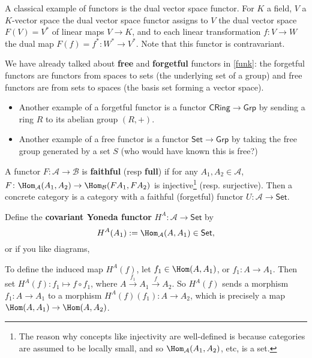 \begin{example}
    A classical example of functors is the dual vector space functor. For $K$ a field, $V$ a $K$-vector space the dual vector space functor assigns to $V$ the dual vector space $F(V)=V^*$ of linear maps $V\to K$, and to each linear transformation $f \colon V \to W$ the dual map $F(f)=f^* \colon W^* \to V^*$. Note that this functor is contravariant. 
\end{example}
\begin{example}
    We have already talked about \textbf{free} and \textbf{forgetful} functors in \cref{funk}: the forgetful functors are functors from spaces to sets (the underlying set of a group) and free functors are from sets to spaces (the basis set forming a vector space).
    \begin{itemize}
        \item Another example of a forgetful functor is a functor $\mathsf{CRing}\to \mathsf{Grp}$ by sending a ring $R$ to its abelian group $(R,+)$.
        \item Another example of a free functor is a functor $\mathsf{Set}\to \mathsf{Grp}$ by taking the free group generated by a set $S$ (who would have known this is free?)
    \end{itemize}
\end{example}
\begin{definition}[]
    A functor $F \colon \mathcal{A}  \to \mathcal{B} $ is \textbf{faithful} (resp \textbf{full}) if for any $A_1,A_2 \in  \mathcal{A} $, $F \colon \Hom_{\mathcal{A} }(A_1,A_2)\to \Hom _{\mathcal{B} }(F A_1,FA_2)$ is injective\footnote{The reason why concepts like injectivity are well-defined is because categories are assumed to be locally small, and so $\Hom _{\mathcal{A}  }(A_1,A_2)$, etc, is a set.} (resp. surjective). Then a concrete category is a category with a faithful (forgetful) functor $U \colon \mathcal{A}  \to \mathsf{Set} $.
\end{definition}
\begin{example}
    Define the \textbf{covariant Yoneda functor} $H^A\colon \mathcal{A}  \to \mathsf{Set} $ by \[
        H^A( A_1):= \Hom _{\mathcal{A} }(A,A_1) \in \mathsf{Set} ,
    \] or if you like diagrams,
    \begin{figure}[H]
    \centering
    \end{figure}To define the induced map $H^A(f)$, let $f_1 \in \Hom(A,A_1)$, or $f_1 \colon A \to A_1$. Then set $H^A(f)\colon f_1 \mapsto  f \circ f_1$, where $A \overset{f_1}{\to } A_1 \overset{f}{\to } A_2$. So $H^A(f)$ sends a morphism $f_1 \colon A \to A_1$ to a morphism $H^A(f)(f_1) \colon A \to A_2$, which is precisely a map $\Hom(A,A_1) \to  \Hom(A,A_2)$.
\end{example}
